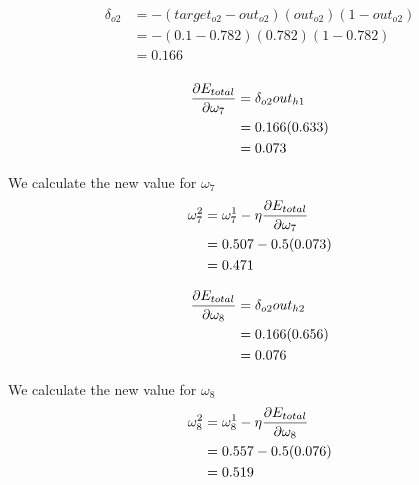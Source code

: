 \documentclass[10pt,a4paper]{article}
\begin{document}
\begin{equation}
\begin{split}
\delta_{o2} &= -(target_{o2} -out_{o2})(out_{o2})(1-out_{o2})\\
            &= -(0.1-0.782)(0.782)(1-0.782)\\
            &= 0.166\\
\end{split}
\end{equation}

\begin{equation}
\begin{split}
\pdv{E_{total}}{\omega_7} &= \delta_{o2}out_{h1}\\
                          &= 0.166(0.633)\\
                          &= 0.073\\
\end{split}
\end{equation}

We calculate the new value for $\omega_7$
\begin{equation}
\begin{split}
\omega_7^2 &= \omega_7^1 - \eta\pdv{E_{total}}{\omega_7}\\
           &= 0.507 -0.5(0.073)\\
           &= 0.471\\
\end{split}
\end{equation}

\begin{equation}
\begin{split}
\pdv{E_{total}}{\omega_8} &= \delta_{o2}out_{h2}\\
                          &= 0.166(0.656)\\
                          &= 0.076\\
\end{split}
\end{equation}

We calculate the new value for $\omega_8$
\begin{equation}
\begin{split}
\omega_8^2 &= \omega_8^1 - \eta\pdv{E_{total}}{\omega_8}\\
           &= 0.557 -0.5(0.076)\\
           &= 0.519\\
\end{split}
\end{equation}
\end{document}
